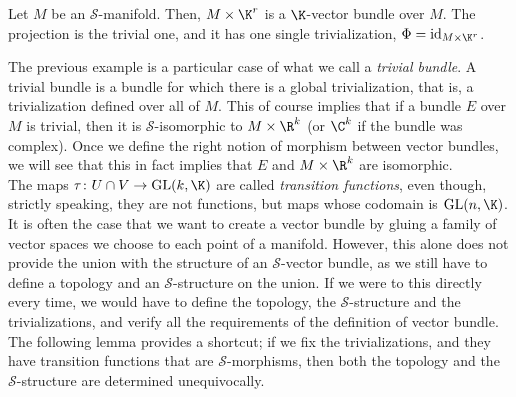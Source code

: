 \begin{example} \label{ex_trivial_bundle}
    Let \(M\) be an \(\mathcal{S}\)-manifold. Then, \(M \times \K^r\) is a \(\K\)-vector bundle over \(M\). The projection is the trivial one, and it has one single trivialization, \(\Phi=\mathrm{id}_{M \times \K^r}\).
\end{example}

The previous example is a particular case of what we call a \textit{trivial bundle}. A trivial bundle is a bundle for which there is a global trivialization, that is, a trivialization defined over all of \(M\). This of course implies that if a bundle \(E\) over \(M\) is trivial, then it is \(\mathcal{S}\)-isomorphic to \(M \times \R^k\) (or \(\C^k\) if the bundle was complex). Once we define the right notion of morphism between vector bundles, we will see that this in fact implies that \(E\) and \(M \times \R^k\) are isomorphic.  \\



The maps \(\tau\colon U \cap V \to \mathrm{GL}(k, \K)\) are called \textit{transition functions}, even though, strictly speaking, they are not functions, but maps whose codomain is \(\mathrm{GL}(n, \K)\). \\

It is often the case that we want to create a vector bundle by gluing a family of vector spaces we choose to each point of a manifold. However, this alone does not provide the union with the structure of an \(\mathcal{S}\)-vector bundle, as we still have to define a topology and an \(\mathcal{S}\)-structure on the union. If we were to this directly every time, we would have to define the topology, the \(\mathcal{S}\)-structure and the trivializations, and verify all the requirements of the definition of vector bundle. The following lemma provides a shortcut; if we fix the trivializations, and they have transition functions that are \(\mathcal{S}\)-morphisms, then both the topology and the \(\mathcal{S}\)-structure are determined unequivocally. \\

